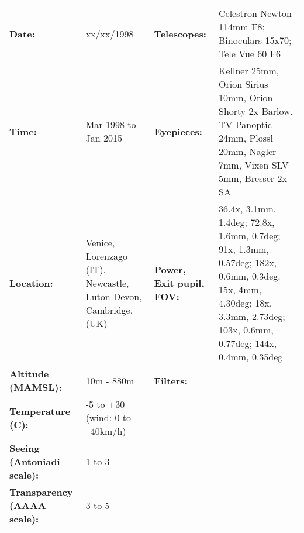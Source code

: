 \begin{tabular}{ p{1.7in} p{1.2in} p{1.5in} p{4.2in}}
{\bf Date:} & xx/xx/1998 & {\bf Telescopes:} & Celestron Newton 114mm F8; Binoculars 15x70; Tele Vue 60 F6 \\ 
{\bf Time:} & Mar 1998 to Jan 2015 & {\bf Eyepieces:} & Kellner 25mm, Orion Sirius 10mm, Orion Shorty 2x Barlow. TV Panoptic 24mm, Plossl 20mm, Nagler 7mm, Vixen SLV 5mm, Bresser 2x SA \\ 
{\bf Location:} & Venice, Lorenzago (IT). Newcastle, Luton Devon, Cambridge, (UK) & {\bf Power, Exit pupil, FOV:} & 36.4x, 3.1mm, 1.4deg; 72.8x, 1.6mm, 0.7deg; 91x, 1.3mm, 0.57deg; 182x, 0.6mm, 0.3deg. 15x, 4mm, 4.30deg; 18x, 3.3mm, 2.73deg; 103x, 0.6mm, 0.77deg; 144x, 0.4mm, 0.35deg \\ 
{\bf Altitude (MAMSL):} & 10m - 880m & {\bf Filters:} &  \\ 
{\bf Temperature (C):} & -5 to +30 (wind: 0 to ~40km/h) & & \\ 
{\bf Seeing (Antoniadi scale):} & 1 to 3 & & \\ 
{\bf Transparency (AAAA scale):} & 3 to 5 & & \\ 
\end{tabular}
\centering 
